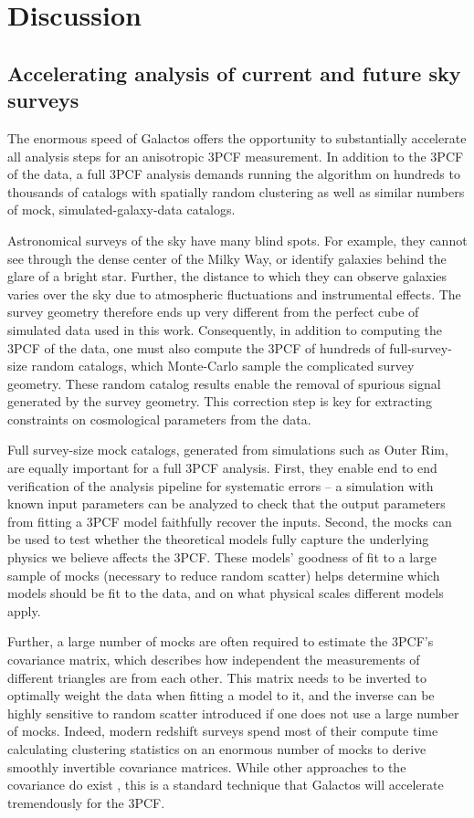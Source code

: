 \section{Discussion}

\subsection{Accelerating analysis of current and future sky surveys}

The enormous speed of Galactos offers the opportunity to substantially accelerate all analysis steps for an anisotropic 3PCF measurement. In addition to the 3PCF of the data, a full 3PCF analysis demands running the algorithm on hundreds to thousands of catalogs with spatially random clustering as well as similar numbers of mock, simulated-galaxy-data catalogs. 

Astronomical surveys of the sky have many blind spots. For example, they cannot see through the dense center of the Milky Way, or identify galaxies behind the glare of a bright star. Further, the distance to which they can observe galaxies varies over the sky due to atmospheric fluctuations and instrumental effects. The survey geometry therefore ends up very different from the perfect cube of simulated data used in this work. Consequently, in addition to computing the 3PCF of the data, one must also compute the 3PCF of hundreds of full-survey-size random catalogs, which Monte-Carlo sample the complicated survey geometry. These random catalog results enable the removal of spurious signal generated by the survey geometry. This correction step is key for extracting constraints on cosmological parameters from the data. 

Full survey-size mock catalogs, generated from simulations such as Outer Rim, are equally important for a full 3PCF analysis. First, they enable end to end verification of the analysis pipeline for systematic errors -- a simulation with known input parameters can be analyzed to check that the output parameters from fitting a 3PCF model faithfully recover the inputs. Second, the mocks can be used to test whether the theoretical models fully capture the underlying physics we believe affects the 3PCF. These models' goodness of fit to a large sample of mocks (necessary to reduce random scatter) helps determine which models should be fit to the data, and on what physical scales different models apply.

Further, a large number of mocks are often required to estimate the 3PCF's covariance matrix, which describes how independent the measurements of different triangles are from each other. This matrix needs to be inverted to optimally weight the data when fitting a model to it, and the inverse can be highly sensitive to random scatter introduced if one does not use a large number of mocks. Indeed, modern redshift surveys spend most of their compute time calculating clustering statistics on an enormous number of mocks to derive smoothly invertible covariance matrices. While other approaches to the covariance do exist \cite{SE3ptalg}, this is a standard technique that Galactos will accelerate tremendously for the 3PCF. 

